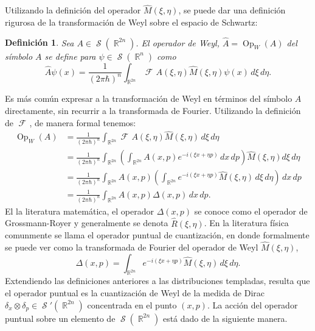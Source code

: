 \documentclass[a4paper]{report}
\DeclareMathOperator{\R}{\mathbb{R}}
\DeclareMathOperator{\Sz}{\mathcal S}
\DeclareMathOperator{\Op}{Op}
\DeclareMathOperator{\Fr}{\mathcal{F}\!}
\newtheorem{definition}{Definición}
\begin{document}
  Utilizando la definición del operador $\hat{M}(\xi,\eta)$,
  se puede dar una definición rigurosa de la transformación
  de Weyl sobre el espacio de Schwartz:
  \begin{definition}
    Sea $A \in \Sz(\R^{2n})$. El operador de Weyl, $\hat{A}
    = \Op_W(A)$ del símbolo $A$ se define para $\psi \in
    \Sz(\R^{n})$ como
    \begin{equation}
      \label{eqn:weyl_quant_2}
      \hat{A}\psi(x)
      = \frac{1}{(2\pi\hbar)^{n}}
      \int_{\R^{2n}} \Fr A(\xi,\eta) \hat{M}(\xi,\eta)
      \psi(x) \, d\xi \, d\eta.
    \end{equation}
  \end{definition}
  Es más común expresar a la transformación de Weyl en términos
  del símbolo $A$ directamente, sin recurrir a la
  transformada de Fourier. Utilizando la definición de $\Fr$,
  de manera formal tenemos:
  \begin{align*}
    \Op_W(A)
    &= \frac{1}{(2\pi\hbar)^{n}} \int_{\R^{2n}} \Fr
    A(\xi,\eta)\hat{M}(\xi,\eta) \, d\xi \, d\eta \\
    &= \frac{1}{(2\pi\hbar)^{n}} \int_{\R^{2n}} \left(
    \int_{\R^{2n}} A(x,p)e^{-i(\xi x + \eta p)} \, dx \, dp
    \right) \hat{M}(\xi,\eta) d\xi \, d\eta \\
    &= \frac{1}{(2\pi\hbar)^{n}} \int_{\R^{2n}} A(x,p) \left(
    \int_{\R^{2n}} e^{-i(\xi x + \eta p)} \hat{M}(\xi,\eta)
    \, d\xi \, d\eta \right) \, dx \, dp \\
    &= \frac{1}{(2\pi\hbar)^{n}} \int_{\R^{2n}} A(x,p)
    \Delta(x,p) \, dx \, dp.
  \end{align*} 
  El la literatura matemática, el operador $\Delta(x,p)$ se
  conoce como el operador de Grossmann-Royer y generalmente
  se denota $\hat{R}(\xi,\eta)$. En la literatura física
  comunmente se llama el operador puntual de cuantización,
  en donde formalmente se puede ver como la transformada de
  Fourier del operador de Weyl $\hat{M}(\xi,\eta)$,
  \begin{equation}
    \label{eqn:phase_point_operator}
    \Delta(x,p)
    = \int_{\R^{2n}} e^{-i(\xi x + \eta p)}
    \hat{M}(\xi,\eta) \, d\xi \, d\eta.
  \end{equation}
  Extendiendo las definiciones anteriores a las
  distribuciones templadas, resulta que el operador puntual
  es la cuantización de Weyl de la medida de Dirac $\delta_x
  \otimes \delta_p \in \Sz'(\R^{2n})$ concentrada en el
  punto $(x,p)$. La acción del operador puntual sobre un
  elemento de $\Sz(\R^{2n})$ está dado de la siguiente
  manera.
\end{document}

